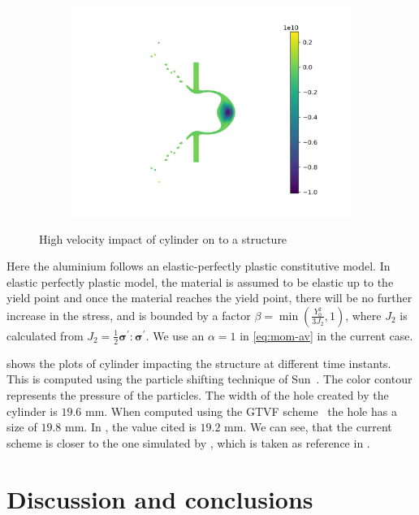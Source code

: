 \documentclass[preprint,12pt]{elsarticle}
\newcommand{\teng}[1]{\ensuremath{\boldsymbol{#1}}}
\begin{document}
\begin{figure}[!htpb]
\begin{subfigure}{0.3\textwidth}
    \includegraphics[width=1.0\textwidth]{figures/high_velocity_impact/etvf_sun2019/time8}
    \label{}
  \end{subfigure}
  \caption{High velocity impact of cylinder on to a structure}
\label{fig:hvi:etvf-sun2019}
\end{figure}
Here the aluminium follows an elastic-perfectly plastic constitutive model. In
elastic perfectly plastic model, the material is assumed to be elastic up to
the yield point and once the material reaches the yield point, there will be
no further increase in the stress, and is bounded by a factor
$\beta = \min\left(\frac{Y_0^2}{3J_2}, 1 \right)$, where $J_2$ is calculated
from $J_2 = \frac{1}{2} \teng{\sigma}^{'} : \teng{\sigma}^{'}$. We use an
$\alpha=1$ in \cref{eq:mom-av} in the current case.

 shows the plots of cylinder impacting the
structure at different time instants. This is computed using the particle
shifting technique of Sun~\cite{sun_consistent_2019}. The color contour
represents the pressure of the particles. The width of the hole created by the
cylinder is $19.6$ mm. When computed using the GTVF
scheme~\cite{zhang_hu_adams17} the hole has a size of $19.8$ mm. In
\citet{howell2002free}, the value cited is $19.2$ mm. We can see, that the
current scheme is closer to the one simulated by \cite{howell2002free}, which
is taken as reference in \cite{zhang_hu_adams17}.


\section{Discussion and conclusions}
\end{document}

